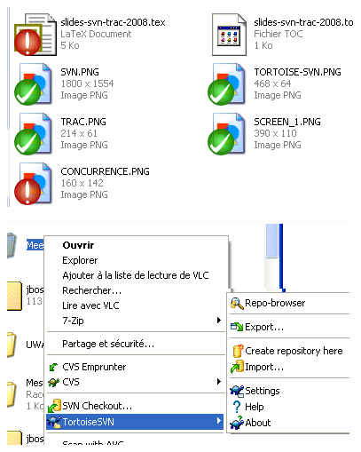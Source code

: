 \begin{frame}
  \begin{figure}
    \begin{center}
      \includegraphics[scale=0.7]{images/dirView}
    \end{center}
  \end{figure}
\end{frame}
\begin{frame}
  \begin{figure}
    \begin{center}
      \includegraphics[scale=0.7]{images/actions}
    \end{center}
  \end{figure}
\end{frame}

